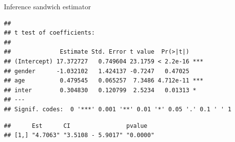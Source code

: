 \documentclass[ignorenonframetext,]{beamer}
\newenvironment{Shaded}{\begin{snugshade}}{\end{snugshade}}
\newcommand{\KeywordTok}[1]{\textcolor[rgb]{0.13,0.29,0.53}{\textbf{#1}}}
\newcommand{\DecValTok}[1]{\textcolor[rgb]{0.00,0.00,0.81}{#1}}
\newcommand{\StringTok}[1]{\textcolor[rgb]{0.31,0.60,0.02}{#1}}
\newcommand{\CommentTok}[1]{\textcolor[rgb]{0.56,0.35,0.01}{\textit{#1}}}
\newcommand{\OperatorTok}[1]{\textcolor[rgb]{0.81,0.36,0.00}{\textbf{#1}}}
\newcommand{\NormalTok}[1]{#1}
\begin{document}
\begin{frame}[fragile]{Inference sandwich estimator}

\tiny

\begin{Shaded}
\end{Shaded}

\begin{verbatim}
## 
## t test of coefficients:
## 
##              Estimate Std. Error t value  Pr(>|t|)    
## (Intercept) 17.372727   0.749604 23.1759 < 2.2e-16 ***
## gender      -1.032102   1.424137 -0.7247   0.47025    
## age          0.479545   0.065257  7.3486 4.712e-11 ***
## inter        0.304830   0.120799  2.5234   0.01313 *  
## ---
## Signif. codes:  0 '***' 0.001 '**' 0.01 '*' 0.05 '.' 0.1 ' ' 1
\end{verbatim}

\begin{Shaded}
\end{Shaded}

\begin{verbatim}
##      Est      CI                pvalue  
## [1,] "4.7063" "3.5108 - 5.9017" "0.0000"
\end{verbatim}

\end{frame}
\end{document}
